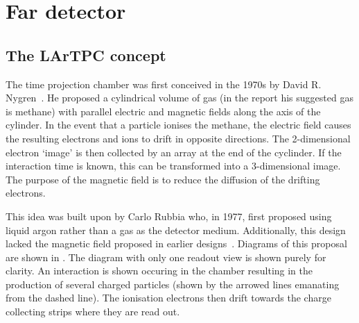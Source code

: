 \section{Far detector}
\label{sec:dune:fd}

\subsection{The LArTPC concept}
\label{sec:dune:fd:lartpc}
The time projection chamber was first conceived in the 1970s by David R. Nygren~\cite{nygrenProp}.
He proposed a cylindrical volume of gas (in the report his suggested gas is methane) with parallel electric and magnetic fields along the axis of the cylinder.
In the event that a particle ionises the methane, the electric field causes the resulting electrons and ions to drift in opposite directions.
The 2-dimensional electron `image' is then collected by an array at the end of the cyclinder.
If the interaction time is known, this can be transformed into a 3-dimensional image. 
The purpose of the magnetic field is to reduce the diffusion of the drifting electrons.

This idea was built upon by Carlo Rubbia who, in 1977, first proposed using liquid argon rather than a gas as the detector medium.
Additionally, this design lacked the magnetic field proposed in earlier designs~\cite{rubbiaProp}.
Diagrams of this proposal are shown in .
The diagram with only one readout view is shown purely for clarity.
An interaction is shown occuring in the chamber resulting in the production of several charged particles (shown by the arrowed lines emanating from the dashed line).
The ionisation electrons then drift towards the charge collecting strips where they are read out.

